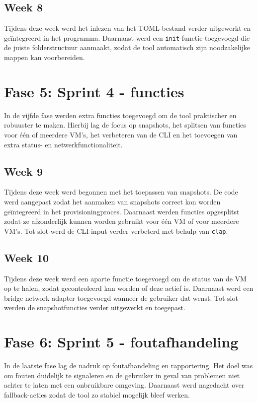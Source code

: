 \subsection{Week 8}
Tijdens deze week werd het inlezen van het TOML-bestand verder uitgewerkt en geïntegreerd in het programma. Daarnaast werd een \texttt{init}-functie toegevoegd die de juiste folderstructuur aanmaakt, zodat de tool automatisch zijn noodzakelijke mappen kan voorbereiden.

\section{Fase 5: Sprint 4 - functies}
In de vijfde fase werden extra functies toegevoegd om de tool praktischer en robuuster te maken. Hierbij lag de focus op snapshots, het splitsen van functies voor één of meerdere VM's, het verbeteren van de CLI en het toevoegen van extra status- en netwerkfunctionaliteit.

\subsection{Week 9}
Tijdens deze week werd begonnen met het toepassen van snapshots. De code werd aangepast zodat het aanmaken van snapshots correct kon worden geïntegreerd in het provisioningproces. Daarnaast werden functies opgesplitst zodat ze afzonderlijk kunnen worden gebruikt voor één VM of voor meerdere VM's. Tot slot werd de CLI-input verder verbeterd met behulp van \texttt{clap}.

\subsection{Week 10}
Tijdens deze week werd een aparte functie toegevoegd om de status van de VM op te halen, zodat gecontroleerd kan worden of deze actief is. Daarnaast werd een bridge network adapter toegevoegd wanneer de gebruiker dat wenst. Tot slot werden de snapshotfuncties verder uitgewerkt en toegepast.

\section{Fase 6: Sprint 5 - foutafhandeling}
In de laatste fase lag de nadruk op foutafhandeling en rapportering. Het doel was om fouten duidelijk te signaleren en de gebruiker in geval van problemen niet achter te laten met een onbruikbare omgeving. Daarnaast werd nagedacht over fallback-acties zodat de tool zo stabiel mogelijk bleef werken.

